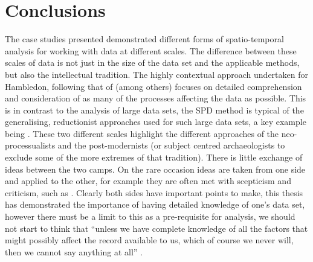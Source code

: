 \section{Conclusions}
The case studies presented demonstrated different forms of spatio-temporal analysis for working with data at different scales. The difference between these scales of data is not just in the size of the data set and the applicable methods, but also the intellectual tradition. The highly contextual approach undertaken for Hambledon, following that of \citet{Whittle:2011kl} (among others) focuses on detailed comprehension and consideration of as many of the processes affecting the data as possible. This is in contrast to the analysis of large data sets, the SPD method is typical of the generalising, reductionist approaches used for such large data sets, a key example being \citet{Shennan:2013fk}. These two different scales highlight the different approaches of the neo-processualists and the post-modernists (or subject centred archaeologists to exclude some of the more extremes of that tradition). There is little exchange of ideas between the two camps. On the rare occasion ideas are taken from one side and applied to the other, for example \citet{Torfing2015193} they are often met with scepticism and criticism, such as \citet{Timpson2015199}. Clearly both sides have important points to make, this thesis has demonstrated the importance of having detailed knowledge of one's data set, however there must be a limit to this as a pre-requisite for analysis, we should not start to think that ``unless we have complete knowledge of all the factors that might possibly affect the record available to us, which of course we never will, then we cannot say anything at all'' \citep[200]{Timpson2015199}. 

